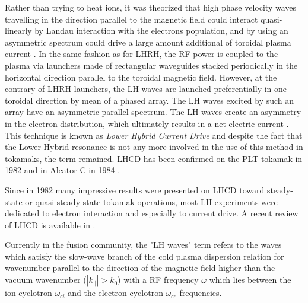 Rather than trying to heat ions, it was theorized that high phase velocity waves travelling in the direction parallel to the magnetic field could interact quasi-linearly by Landau interaction with the electrons population, and by using an asymmetric spectrum could drive a large amount additional of toroidal plasma current . In the same fashion as for LHRH, the RF power is coupled to the plasma via launchers made of rectangular waveguides stacked periodically in the horizontal direction parallel to the toroidal magnetic field. However, at the contrary of LHRH launchers, the LH waves are launched preferentially in one toroidal direction by mean of a phased array. The LH waves excited by such an array have an asymmetric parallel spectrum. The LH waves create an asymmetry in the electron distribution, which ultimately results in a net electric current . This technique is known as \emph{Lower Hybrid Current Drive} and despite the fact that the Lower Hybrid resonance is not any more involved in the use of this method in tokamaks, the term remained. LHCD has been confirmed on the PLT tokamak in 1982  and in Alcator-C in 1984 . 

Since in 1982 many impressive results were presented on LHCD toward steady-state or quasi-steady state tokamak operations, most LH experiments were dedicated to electron interaction and especially to current drive. A recent review of LHCD is available in .

Currently in the fusion community, the "LH waves" term refers to the waves which satisfy the slow-wave branch of the cold plasma dispersion relation for wavenumber parallel to the direction of the magnetic field higher than the vacuum wavenumber ($|k_{\parallel}|>k_0$) with a RF frequency $\omega$ which lies between the ion cyclotron $\omega_{ci}$ and the electron cyclotron $\omega_{ce}$ frequencies. 



